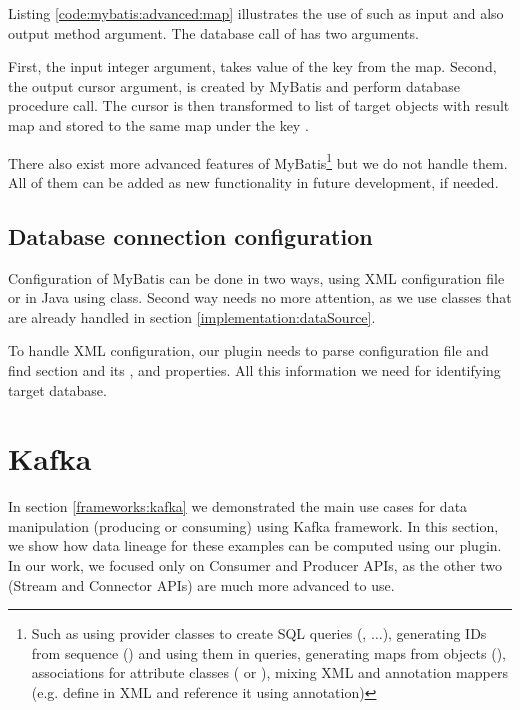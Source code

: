 Listing \ref{code:mybatis:advanced:map} illustrates the use of such  as
input and also output method argument.
The database call of  has two arguments.

First, the input integer argument, takes value of the  key from the map.
Second, the output cursor argument, is created by MyBatis and perform database procedure call.
The cursor is then transformed to list of target objects
with result map  and stored to the same map under the key .


There also exist more advanced features of MyBatis\footnote{
  Such as using provider classes to create SQL queries (, $\ldots$),
  generating IDs from sequence () and using them in queries,
  generating maps from objects (),
  associations for attribute classes ( or ),
  mixing XML and annotation mappers (e.g. define  in XML and reference it
  using  annotation)}
but we do not handle them. All of them can be added as new functionality in future development,
if needed.




\subsection{Database connection configuration}

Configuration of MyBatis can be done in two ways, using XML configuration file
or in Java using  class. Second way needs no more attention,
as we use  classes that are already handled in section \ref{implementation:dataSource}.

To handle XML configuration, our plugin needs to parse configuration file and find 
section and its ,  and  properties. All this
information we need for identifying target database.




\section{Kafka}

In section \ref{frameworks:kafka} we demonstrated the main use cases
for data manipulation (producing or consuming) using Kafka framework.
In this section, we show how data lineage for these examples can be computed
using our plugin. In our work, we focused only on Consumer and Producer APIs,
as the other two (Stream and Connector APIs) are much more advanced to use.

